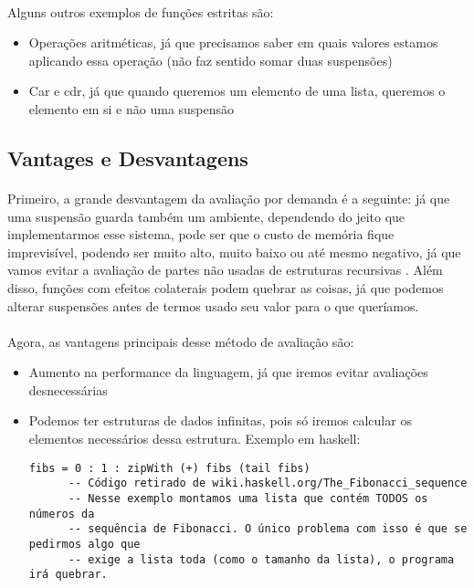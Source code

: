 \documentclass[11pt]{article}
\begin{document}
\paragraph{} Alguns outros exemplos de funções estritas são:

\begin{itemize}
\item Operações aritméticas, já que precisamos saber em quais valores estamos aplicando essa operação (não faz sentido somar duas suspensões)
\item Car e cdr, já que quando queremos um elemento de uma lista, queremos o elemento em si e não uma suspensão
\end{itemize}

\subsection{Vantages e Desvantagens}
\label{sec:org5cbc80f}
\paragraph{} Primeiro, a grande desvantagem da avaliação por demanda é a seguinte: já que uma suspensão guarda também um ambiente,
dependendo do jeito que implementarmos esse sistema, \color{red} pode ser que o custo de memória fique imprevisível, podendo ser muito alto, muito baixo ou até mesmo negativo, já que vamos evitar a avaliação de partes não usadas de estruturas recursivas \color{black}. Além disso, funções
com efeitos colaterais podem quebrar as coisas, já que podemos alterar suspensões antes de termos usado seu valor para o que queríamos.

\paragraph{} Agora, as vantagens principais desse método de avaliação são:

\begin{itemize}
\item Aumento na performance da linguagem, já que iremos evitar avaliações desnecessárias
\item Podemos ter estruturas de dados infinitas, pois só iremos calcular os elementos necessários dessa estrutura. Exemplo em haskell:
\begin{verbatim}
fibs = 0 : 1 : zipWith (+) fibs (tail fibs)
      -- Código retirado de wiki.haskell.org/The_Fibonacci_sequence
      -- Nesse exemplo montamos uma lista que contém TODOS os números da
      -- sequência de Fibonacci. O único problema com isso é que se pedirmos algo que
      -- exige a lista toda (como o tamanho da lista), o programa irá quebrar.
\end{verbatim}
\end{itemize}
\end{document}

